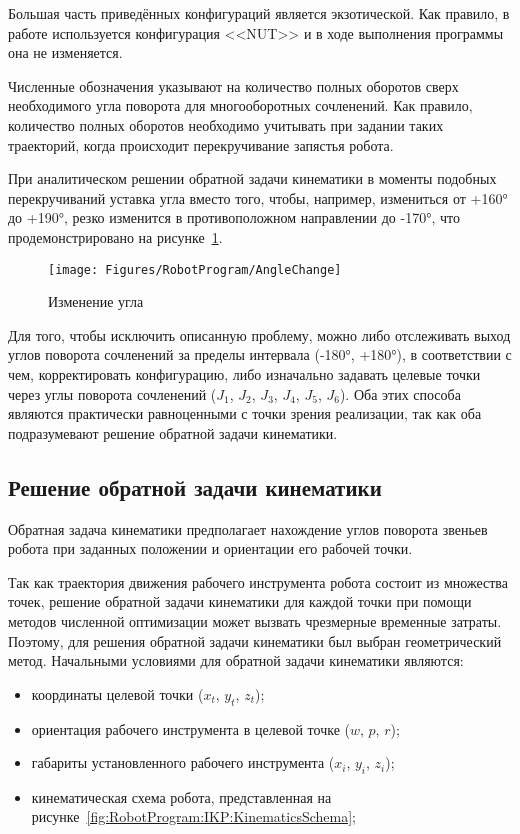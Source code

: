 Большая часть приведённых конфигураций является экзотической.
Как правило, в работе используется конфигурация <<NUT>> и в ходе выполнения программы она не изменяется.

Численные обозначения указывают на количество полных оборотов сверх необходимого угла поворота для многооборотных сочленений.
Как правило, количество полных оборотов необходимо учитывать при задании таких траекторий, когда происходит перекручивание запястья робота.

При аналитическом решении обратной задачи кинематики в моменты подобных перекручиваний уставка угла вместо того, чтобы, например, измениться от +160° до +190°, резко изменится в противоположном направлении до -170°, что продемонстрировано на рисунке~\ref{fig:RobotProgram:AngleChange}.

\begin{figure}[H]
    \centering
    \vspace{14pt}
    \texttt{[image: Figures/RobotProgram/AngleChange]}
    \caption{Изменение угла}
    \label{fig:RobotProgram:AngleChange}
\end{figure}

Для того, чтобы исключить описанную проблему, можно либо отслеживать выход углов поворота сочленений за пределы интервала (-180°, +180°), в соответствии с чем, корректировать конфигурацию, либо изначально задавать целевые точки через углы поворота сочленений ($J_1$, $J_2$, $J_3$, $J_4$, $J_5$, $J_6$).
Оба этих способа являются практически равноценными с точки зрения реализации, так как оба подразумевают решение обратной задачи кинематики.

\subsection{Решение обратной задачи кинематики}
Обратная задача кинематики предполагает нахождение углов поворота звеньев робота при заданных положении и ориентации его рабочей точки.

Так как траектория движения рабочего инструмента робота состоит из множества точек, решение обратной задачи кинематики для каждой точки при помощи методов численной оптимизации может вызвать чрезмерные временные затраты.
Поэтому, для решения обратной задачи кинематики был выбран геометрический метод.
Начальными условиями для обратной задачи кинематики являются:

\begin{itemize}
    \item координаты целевой точки ($x_t$, $y_t$, $z_t$);
    \item ориентация рабочего инструмента в целевой точке ($w$, $p$, $r$);
    \item габариты установленного рабочего инструмента ($x_i$, $y_i$, $z_i$);
    \item кинематическая схема робота, представленная на рисунке~\ref{fig:RobotProgram:IKP:KinematicsSchema};
\end{itemize}

